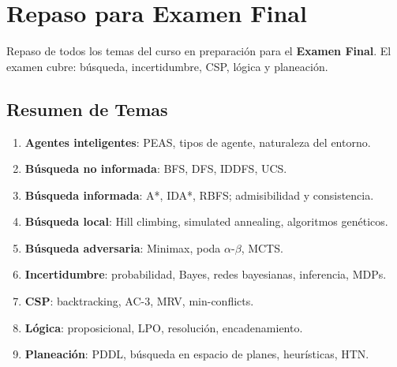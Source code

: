 \section{Repaso para Examen Final}

\begin{notebox}
Repaso de todos los temas del curso en preparación para el \textbf{Examen Final}.
El examen cubre: búsqueda, incertidumbre, CSP, lógica y planeación.
\end{notebox}

\subsection{Resumen de Temas}

\begin{enumerate}
    \item \textbf{Agentes inteligentes}: PEAS, tipos de agente, naturaleza del entorno.
    \item \textbf{Búsqueda no informada}: BFS, DFS, IDDFS, UCS.
    \item \textbf{Búsqueda informada}: A*, IDA*, RBFS; admisibilidad y consistencia.
    \item \textbf{Búsqueda local}: Hill climbing, simulated annealing, algoritmos genéticos.
    \item \textbf{Búsqueda adversaria}: Minimax, poda $\alpha$-$\beta$, MCTS.
    \item \textbf{Incertidumbre}: probabilidad, Bayes, redes bayesianas, inferencia, MDPs.
    \item \textbf{CSP}: backtracking, AC-3, MRV, min-conflicts.
    \item \textbf{Lógica}: proposicional, LPO, resolución, encadenamiento.
    \item \textbf{Planeación}: PDDL, búsqueda en espacio de planes, heurísticas, HTN.
\end{enumerate}

